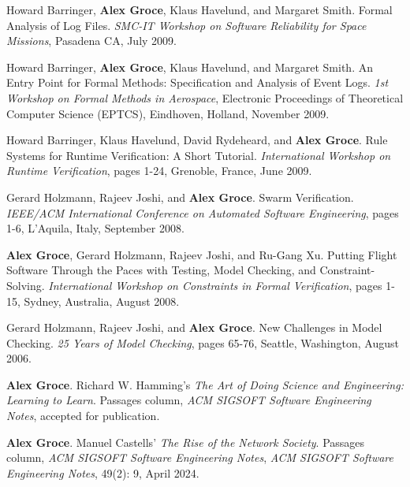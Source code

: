 \documentclass[ComputerScience]{vita}
\begin{document}
\begin{vita}
\begin{Invited Papers}
\item Howard Barringer, {\bf Alex Groce}, Klaus Havelund, and Margaret Smith.
\newblock Formal Analysis of Log Files.
\newblock \emph{SMC-IT Workshop on Software Reliability for Space Missions}, Pasadena CA, July 2009.


\item Howard Barringer, {\bf Alex Groce}, Klaus Havelund, and Margaret Smith.
\newblock An Entry Point for Formal Methods:  Specification and Analysis of Event Logs.
\newblock \emph{1st Workshop on Formal Methods in Aerospace}, Electronic Proceedings of Theoretical Computer Science (EPTCS), Eindhoven, Holland, November 2009.

\item Howard Barringer, Klaus Havelund, David Rydeheard, and {\bf Alex Groce}.
\newblock Rule Systems for Runtime Verification: A Short Tutorial.
\newblock \emph{International Workshop on Runtime Verification}, pages 1-24, Grenoble, France, June 2009.

\item Gerard Holzmann, Rajeev Joshi, and {\bf Alex Groce}.
\newblock Swarm Verification.
\newblock \emph{IEEE/ACM International Conference on Automated Software Engineering}, pages 1-6, L'Aquila, Italy, September 2008.

\item {\bf Alex Groce}, Gerard Holzmann, Rajeev Joshi, and Ru-Gang Xu.
\newblock Putting Flight Software Through the Paces with Testing, Model Checking, and Constraint-Solving.
\newblock \emph{International Workshop on Constraints in Formal Verification}, pages 1-15, Sydney, Australia, August 2008.

\item
Gerard Holzmann, Rajeev Joshi, and {\bf Alex Groce}.
\newblock New Challenges in Model Checking.
\newblock \emph
{25 Years of Model Checking}, pages 65-76, Seattle, Washington, August 2006.
\end{Invited Papers}

\begin{Columns, Book Reviews, and Magazine Articles}
\item {\bf Alex Groce}.
  \newblock Richard W. Hamming's \emph{The Art of Doing Science and Engineering: Learning to Learn}.
  \newblock Passages column, \emph{ACM SIGSOFT Software Engineering 
  Notes}, accepted for publication.
  
\item {\bf Alex Groce}.
  \newblock Manuel Castells' \emph{The Rise of the Network Society}.
  \newblock Passages column, \emph{ACM SIGSOFT Software Engineering 
  Notes}, \emph{ACM SIGSOFT Software Engineering Notes}, 49(2): 9, April 2024.
  

\end{Columns, Book Reviews, and Magazine Articles}
\end{vita}
\end{document}
